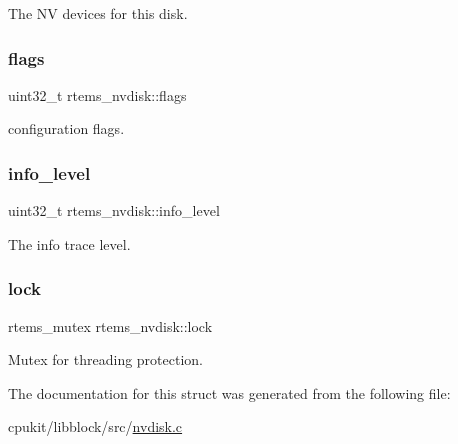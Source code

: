 The NV devices for this disk. \mbox{\label{structrtems__nvdisk_a6739f489add6b00bea568f87a611ae35}} 
\subsubsection{\texorpdfstring{flags}{flags}}
{\footnotesize\ttfamily uint32\+\_\+t rtems\+\_\+nvdisk\+::flags}

configuration flags. \mbox{\label{structrtems__nvdisk_a4f00a9bfc487f8f7052c701a343aa6bc}} 
\subsubsection{\texorpdfstring{info\_level}{info\_level}}
{\footnotesize\ttfamily uint32\+\_\+t rtems\+\_\+nvdisk\+::info\+\_\+level}

The info trace level. \mbox{\label{structrtems__nvdisk_a031672b95e860c39356e721692df0bad}} 
\subsubsection{\texorpdfstring{lock}{lock}}
{\footnotesize\ttfamily rtems\+\_\+mutex rtems\+\_\+nvdisk\+::lock}

Mutex for threading protection. 

The documentation for this struct was generated from the following file\+:\begin{DoxyCompactItemize}
\item 
cpukit/libblock/src/\mbox{\hyperlink{nvdisk_8c}{nvdisk.\+c}}\end{DoxyCompactItemize}
